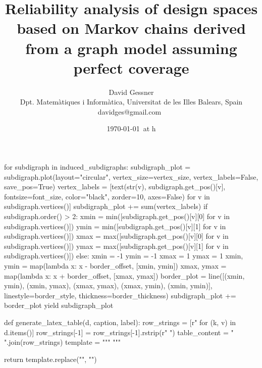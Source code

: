 \documentclass[times,a4paper,10pt,twocolumn]{article}
\theoremstyle{definition}
\theoremstyle{definition}
\theoremstyle{plain}
\begin{document}
\begin{sagesilent}
    for subdigraph in induced_subdigraphs:
        subdigraph_plot = subdigraph.plot(layout="circular",
            vertex_size=vertex_size, vertex_labels=False, save_pos=True)
        vertex_labels = [text(str(v), subdigraph.get_pos()[v],
            fontsize=font_size, color="black", zorder=10,
            axes=False) for v in subdigraph.vertices()]
        subdigraph_plot += sum(vertex_labels)
        if subdigraph.order() > 2:
            xmin = min([subdigraph.get_pos()[v][0] for v in
                subdigraph.vertices()])
            ymin = min([subdigraph.get_pos()[v][1] for v in
                subdigraph.vertices()])
            xmax = max([subdigraph.get_pos()[v][0] for v in
                subdigraph.vertices()])
            ymax = max([subdigraph.get_pos()[v][1] for v in
                subdigraph.vertices()])
        else:
            xmin = -1
            ymin = -1
            xmax =  1
            ymax =  1
        xmin, ymin = map(lambda x: x - border_offset, [xmin, ymin])
        xmax, ymax = map(lambda x: x + border_offset, [xmax, ymax])
        border_plot = line([(xmin, ymin), (xmin, ymax),
            (xmax, ymax), (xmax, ymin), (xmin, ymin)],
            linestyle=border_style, thickness=border_thickness)
        subdigraph_plot += border_plot
        yield subdigraph_plot

def generate_latex_table(d, caption, label):
    row_strings = [r"%
        for (k, v) in d.items()]
    row_strings[-1] = row_strings[-1].rstrip(r" \NN")
    table_content = " ".join(row_strings)
    template = """
        """ %

    return template.replace("\n", "")

\end{sagesilent}

\title{
Reliability analysis of design spaces based on Markov chains derived from a
graph model assuming perfect coverage
}

\author{David Gessner\\
Dpt. Matem\`atiques i Inform\`atica, Universitat de les Illes Balears, Spain\\
davidges@gmail.com\
\date{\today~at {\currenttime}h}
}

\maketitle
\thispagestyle{empty}
\end{document}
